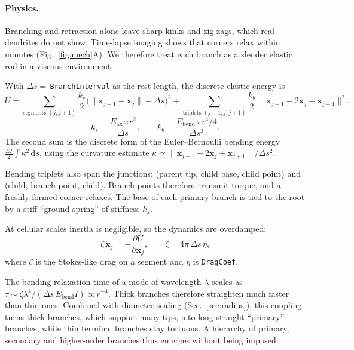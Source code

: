 \documentclass[11pt,a4paper]{article}
\newcommand{\code}[1]{\texttt{#1}}
\newcommand{\vect}[1]{\bm{#1}}
\newcommand{\dd}{\mathrm{d}}
\begin{document}
\paragraph{Physics.}
Branching and retraction alone leave sharp kinks and zig-zags, which real dendrites do not show. Time-lapse imaging shows that corners relax within minutes (Fig.~\ref{fig:mech}A). We therefore treat each branch as a slender elastic rod in a viscous environment.

With $\Delta s=$\,\code{BranchInterval} as the rest length, the discrete elastic energy is
\begin{equation}
  U=\sum_{\text{segments }(j,j+1)}\frac{k_s}{2}\big(\lVert\vect x_{j+1}-\vect x_j\rVert-\Delta s\big)^2
   +\sum_{\text{triplets }(j-1,j,j+1)}\frac{k_b}{2}\,\big\lVert\vect x_{j-1}-2\vect x_j+\vect x_{j+1}\big\rVert^2 ,
  \label{eq:energy}
\end{equation}
\begin{equation}
  k_s=\frac{E_\text{ax}\,\pi r^2}{\Delta s},\qquad k_b=\frac{E_\text{bend}\,\pi r^4/4}{\Delta s^3}.
\end{equation}
The second sum is the discrete form of the Euler--Bernoulli bending energy $\tfrac{EI}{2}\int\kappa^2\,\dd s$, using the curvature estimate $\kappa\simeq\lVert\vect x_{j-1}-2\vect x_j+\vect x_{j+1}\rVert/\Delta s^2$.

Bending triplets also span the junctions: (parent tip, child base, child point) and (child, branch point, child). Branch points therefore transmit torque, and a freshly formed corner relaxes. The base of each primary branch is tied to the root by a stiff ``ground spring'' of stiffness $k_s$.

At cellular scales inertia is negligible, so the dynamics are overdamped:
\begin{equation}
  \zeta\,\dot{\vect x}_j=-\frac{\partial U}{\partial\vect x_j},\qquad \zeta=4\pi\,\Delta s\,\eta,
\end{equation}
where $\zeta$ is the Stokes-like drag on a segment and $\eta$ is \code{DragCoef}.

The bending relaxation time of a mode of wavelength $\lambda$ scales as $\tau\sim\zeta\lambda^4/(\Delta s\,E_\text{bend}I)\propto r^{-4}$. Thick branches therefore straighten much faster than thin ones. Combined with diameter scaling (Sec.~\ref{sec:radius}), this coupling turns thick branches, which support many tips, into long straight ``primary'' branches, while thin terminal branches stay tortuous. A hierarchy of primary, secondary and higher-order branches thus emerges without being imposed.
\end{document}
